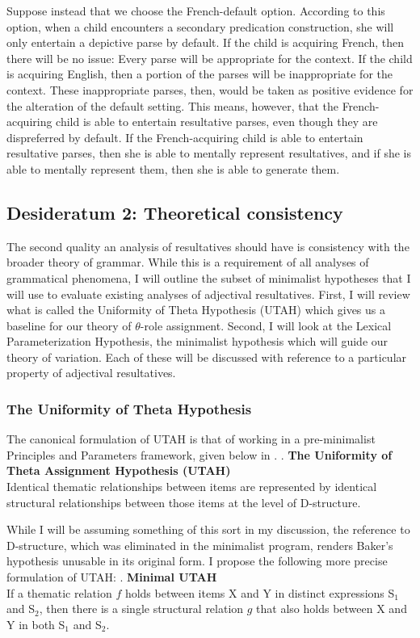 \documentclass[MilwayThesis]{subfiles}
\begin{document}
Suppose instead that we choose the French-default option.
According to this option, when a child encounters a secondary predication construction, she will only entertain a depictive parse by default.
If the child is acquiring French, then there will be no issue:
Every parse will be appropriate for the context.
If the child is acquiring English, then a portion of the parses will be inappropriate for the context.
These inappropriate parses, then, would be taken as positive evidence for the alteration of the default setting.
This means, however, that the French-acquiring child is able to entertain resultative parses, even though they are dispreferred by default.
If the French-acquiring child is able to entertain resultative parses, then she is able to mentally represent resultatives, and if she is able to mentally represent them, then she is able to generate them.

\subsection{Desideratum 2: Theoretical consistency}
The second quality an analysis of resultatives should have is consistency with the broader theory of grammar.
While this is a requirement of all analyses of grammatical phenomena, I will outline the subset of minimalist hypotheses that I will use to evaluate existing analyses of adjectival resultatives.
First, I will review what is called the Uniformity of Theta Hypothesis (UTAH) which gives us a baseline for our theory of $\theta$-role assignment.
Second, I will look at the Lexical Parameterization Hypothesis, the minimalist hypothesis which will guide our theory of variation.
Each of these will be discussed with reference to a particular property of adjectival resultatives.

\subsubsection{The Uniformity of Theta Hypothesis}
The canonical formulation of UTAH is that of \textcite{baker1988incorporation} working in a pre-minimalist Principles and Parameters framework, given below in \Next.
\ex. \textbf{The Uniformity of Theta Assignment Hypothesis (UTAH)}\\
Identical thematic relationships between items are represented by identical structural relationships between those items at the level of D-structure. \parencite[46]{baker1988incorporation}

While I will be assuming something of this sort in my discussion, the reference to D-structure, which was eliminated in the minimalist program, renders Baker's hypothesis unusable in its original form.
I propose the following more precise formulation of UTAH:
\ex. \textbf{Minimal UTAH}\\
If a thematic relation $f$ holds between items X and Y in distinct expressions S$_1$ and S$_2$, then there is a single structural relation $g$ that also holds between X and Y in both S$_1$ and S$_2$.
\end{document}
